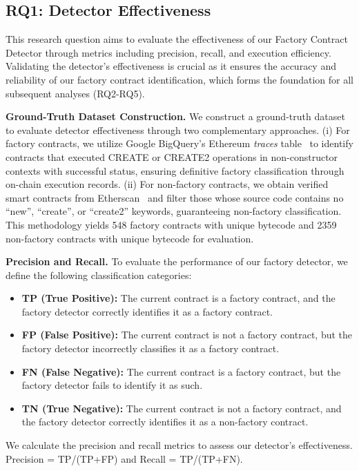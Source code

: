\subsection{RQ1: Detector Effectiveness}
This research question aims to evaluate the effectiveness of our Factory Contract Detector through
metrics including precision, recall, and execution efficiency. Validating the detector's
effectiveness is crucial as it ensures the accuracy and reliability of our factory contract
identification, which forms the foundation for all subsequent analyses (RQ2-RQ5).

\textbf{Ground-Truth Dataset Construction.} We construct a ground-truth dataset to evaluate
detector effectiveness through two complementary approaches. (i) For factory contracts, we
utilize Google BigQuery's Ethereum \textit{traces} table~\cite{bigquery-ethereum-traces} to identify
contracts that executed CREATE or CREATE2 operations in non-constructor contexts with successful
status, ensuring definitive factory classification through on-chain execution records. (ii) For non-factory
contracts, we obtain verified smart contracts from Etherscan~\cite{etherscan-verified-contracts}
and filter those whose source code contains no ``new'', ``create'', or ``create2'' keywords, guaranteeing
non-factory classification. This methodology yields 548 factory contracts with unique bytecode
and 2359 non-factory contracts with unique bytecode for evaluation.

\textbf{Precision and Recall.} To evaluate the performance of our factory detector, we define
the following classification categories:
\begin{itemize}[leftmargin=0.4cm,topsep=0.1cm]
	\item \textbf{TP (True Positive):} The current contract is a factory contract, and the factory
	detector correctly identifies it as a factory contract.

	\item \textbf{FP (False Positive):} The current contract is not a factory contract, but the factory
	detector incorrectly classifies it as a factory contract.

	\item \textbf{FN (False Negative):} The current contract is a factory contract, but the factory
	detector fails to identify it as such.

	\item \textbf{TN (True Negative):} The current contract is not a factory contract, and the factory
	detector correctly identifies it as a non-factory contract.
\end{itemize}
We calculate the precision and recall metrics to assess our detector's effectiveness. Precision
= TP/(TP+FP) and Recall = TP/(TP+FN).

